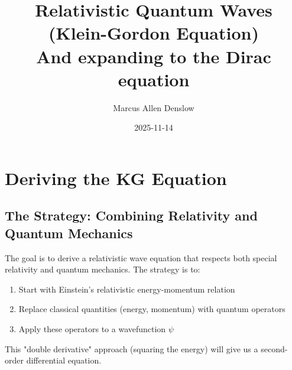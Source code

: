 \documentclass{report}
\title{\Huge{Relativistic Quantum Waves (Klein-Gordon Equation)}\\ And expanding to the Dirac equation }
\author{\Huge{Marcus Allen Denslow}}
\date{2025-11-14}
\begin{document}
\maketitle
\newpage%
\tableofcontents
\pagebreak


\chapter{Deriving the KG Equation}
\section{The Strategy: Combining Relativity and Quantum Mechanics}
The goal is to derive a relativistic wave equation that respects both special relativity and quantum mechanics. The strategy is to:
\begin{enumerate}
	\item Start with Einstein's relativistic energy-momentum relation
	\item Replace classical quantities (energy, momentum) with quantum operators
	\item Apply these operators to a wavefunction $\psi$
\end{enumerate}
This "double derivative" approach (squaring the energy) will give us a second-order differential equation.

\end{document}
